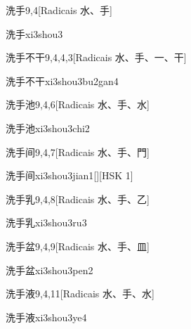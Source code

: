\begin{entry}{洗手}{9,4}[Radicais ⽔、⼿]
  \begin{phonetics}{洗手}{xi3shou3}
  \end{phonetics}
\end{entry}

\begin{entry}{洗手不干}{9,4,4,3}[Radicais ⽔、⼿、⼀、⼲]
  \begin{phonetics}{洗手不干}{xi3shou3bu2gan4}
  \end{phonetics}
\end{entry}

\begin{entry}{洗手池}{9,4,6}[Radicais ⽔、⼿、⽔]
  \begin{phonetics}{洗手池}{xi3shou3chi2}
  \end{phonetics}
\end{entry}

\begin{entry}{洗手间}{9,4,7}[Radicais ⽔、⼿、⾨]
  \begin{phonetics}{洗手间}{xi3shou3jian1}[][HSK 1]
  \end{phonetics}
\end{entry}

\begin{entry}{洗手乳}{9,4,8}[Radicais ⽔、⼿、⼄]
  \begin{phonetics}{洗手乳}{xi3shou3ru3}
  \end{phonetics}
\end{entry}

\begin{entry}{洗手盆}{9,4,9}[Radicais ⽔、⼿、⽫]
  \begin{phonetics}{洗手盆}{xi3shou3pen2}
  \end{phonetics}
\end{entry}

\begin{entry}{洗手液}{9,4,11}[Radicais ⽔、⼿、⽔]
  \begin{phonetics}{洗手液}{xi3shou3ye4}
  \end{phonetics}
\end{entry}

